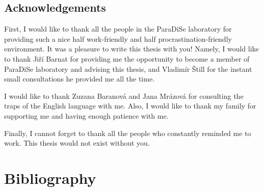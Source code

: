 \documentclass[11pt,twoside,a4paper]{book}
\begin{document}
\cleardoublepage

\section*{Acknowledgements}
First, I would like to thank all the people in the ParaDiSe laboratory for
providing such a nice half work-friendly and half procrastination-friendly
environment. It was a pleasure to write this thesis with you! Namely, I would
like to thank Jiří Barnat for providing me the opportunity to become a member of
ParaDiSe laboratory and advising this thesis, and Vladimír Štill for the instant
small consultations he provided me all the time.

I would like to thank Zuzana Baranová and Jana Mrázová for consulting the traps
of the English language with me. Also, I would like to thank my family for
supporting me and having enough patience with me.

Finally, I cannot forget to thank all the people who constantly reminded me to
work. This thesis would not exist without you.


\cleardoublepage
\thispagestyle{empty}

\pagestyle{headings}
\tableofcontents
\mainmatter









\chapter*{Bibliography}
\markboth{}{} %
\printbibliography[heading=none]

\appendix


\end{document}
